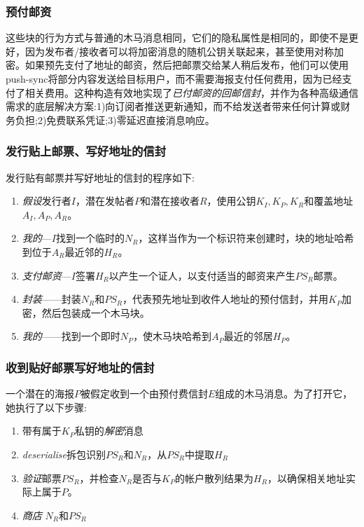 \subsubsection{预付邮资}

这些块的行为方式与普通的木马消息相同，它们的隐私属性是相同的，即使不是更好，因为发布者/接收者可以将加密消息的随机公钥关联起来，甚至使用对称加密。如果预先支付了地址的邮资，然后把邮票交给某人稍后发布，他们可以使用push-sync将部分内容发送给目标用户，而不需要海报支付任何费用，因为已经支付了相关费用。这种构造有效地实现了\emph{已付邮资的回邮信封}，并作为各种高级通信需求的底层解决方案:1)向订阅者推送更新通知，而不给发送者带来任何计算或财务负担;2)免费联系凭证;3)零延迟直接消息响应。  


\subsubsection{发行贴上邮票、写好地址的信封}

发行贴有邮票并写好地址的信封的程序如下:

\begin{enumerate}
\item \emph{假设}发行者$I$，潜在发帖者$P$和潜在接收者$R$，使用公钥$K_I, K_P, K_R$和覆盖地址$A_I, A_P, A_R$。
\item \emph{我的}—$I$找到一个临时的$N_R$，这样当作为一个标识符来创建时，块的地址哈希到位于$A_R$最近邻的$H_R$。
\item \emph{支付邮资}—$I$签署$H_R$以产生一个证人，以支付适当的邮资来产生$PS_R$邮票。
\item \emph{封装}——封装$N_R$和$PS_R$，代表预先地址到收件人地址的预付信封，并用$K_P$加密，然后包装成一个木马块。
\item \emph{我的}——找到一个即时$N_P$，使木马块哈希到$A_P$最近的邻居$H_P$。 
\end{enumerate}




\subsubsection{收到贴好邮票写好地址的信封}

一个潜在的海报$P$被假定收到一个由预付费信封$E$组成的木马消息。为了打开它，她执行了以下步骤:

\begin{enumerate}
    \item 带有属于$K_P$私钥的\emph{解密}消息
    \item \emph{deserialise}拆包识别$PS_R$和$N_R$，从$PS_R$中提取$H_R$
    \item \emph{验证}邮票$PS_R$，并检查$N_R$是否与$K_P$的帐户散列结果为$H_R$，以确保相关地址实际上属于$P$。
    \item \emph{商店} $N_R$和$PS_R$ 
\end{enumerate}

